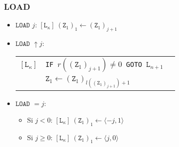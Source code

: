 \documentclass[twoside]{article}
\begin{document}
\newpage

\subsubsection{LOAD}
\begin{itemize}
\item $\texttt{LOAD }j$: 
$[\texttt{L}_\kappa]\ (\texttt{Z}_1)_{1}\leftarrow(\texttt{Z}_1)_{j+1}$

\item $\texttt{LOAD }\uparrow j$:

\begin{tabular}{l l l}
$[\texttt{L}_\kappa]$&\texttt{IF }$r((\texttt{Z}_1)_{j+1})\neq 0$\texttt{ GOTO }$\texttt{L}_{n+1}$&\\
& $\texttt{Z}_{1}\leftarrow(\texttt{Z}_1)_{l((\texttt{Z}_1)_{j+1})+1}$ 
\end{tabular}
\item $\texttt{LOAD }=j$:
\begin{itemize}
\item Si $j< 0$:
$[\texttt{L}_\kappa]\ (\texttt{Z}_1)_{1}\leftarrow \langle -j,1\rangle$
\item Si $j\geq 0$:
$[\texttt{L}_\kappa]\ (\texttt{Z}_1)_{1}\leftarrow \langle j,0\rangle$
\end{itemize}
\end{itemize}
\end{document}
